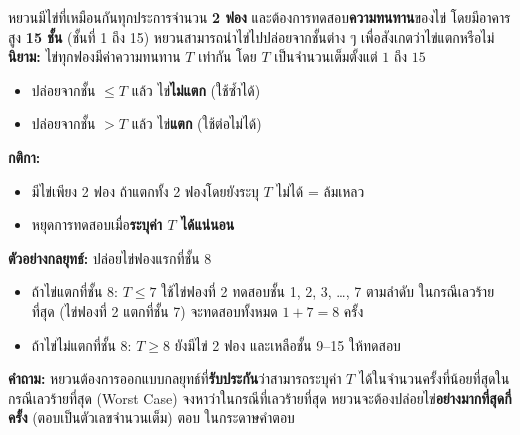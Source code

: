 \question หยวนมีไข่ที่เหมือนกันทุกประการจำนวน \textbf{2 ฟอง} และต้องการทดสอบ\textbf{ความทนทาน}ของไข่ โดยมีอาคารสูง \textbf{15 ชั้น} (ชั้นที่ 1 ถึง 15) หยวนสามารถนำไข่ไปปล่อยจากชั้นต่าง ๆ เพื่อสังเกตว่าไข่แตกหรือไม่
\newline
\textbf{นิยาม:} ไข่ทุกฟองมีค่าความทนทาน $T$ เท่ากัน โดย $T$ เป็นจำนวนเต็มตั้งแต่ $1$ ถึง $15$
\begin{itemize}
  \item ปล่อยจากชั้น $\le T$ แล้ว ไข่\textbf{ไม่แตก} (ใช้ซ้ำได้)
  \item ปล่อยจากชั้น $> T$ แล้ว ไข่\textbf{แตก} (ใช้ต่อไม่ได้)
\end{itemize}

\textbf{กติกา:}
\begin{itemize}
  \item มีไข่เพียง 2 ฟอง ถ้าแตกทั้ง 2 ฟองโดยยังระบุ $T$ ไม่ได้ = ล้มเหลว
  \item หยุดการทดสอบเมื่อ\textbf{ระบุค่า $T$ ได้แน่นอน}
\end{itemize}

\textbf{ตัวอย่างกลยุทธ์:} ปล่อยไข่ฟองแรกที่ชั้น 8
\begin{itemize}
  \item ถ้าไข่แตกที่ชั้น 8: $T \le 7$ ใช้ไข่ฟองที่ 2 ทดสอบชั้น 1, 2, 3, …, 7 ตามลำดับ ในกรณีเลวร้ายที่สุด (ไข่ฟองที่ 2 แตกที่ชั้น 7) จะทดสอบทั้งหมด $1 + 7 = 8$ ครั้ง
  \item ถ้าไข่ไม่แตกที่ชั้น 8: $T \ge 8$ ยังมีไข่ 2 ฟอง และเหลือชั้น 9--15 ให้ทดสอบ
\end{itemize}

\textbf{คำถาม:} หยวนต้องการออกแบบกลยุทธ์ที่\textbf{รับประกัน}ว่าสามารถระบุค่า $T$ ได้ในจำนวนครั้งที่น้อยที่สุดในกรณีเลวร้ายที่สุด (Worst Case) จงหาว่าในกรณีที่เลวร้ายที่สุด หยวนจะต้องปล่อยไข่\textbf{อย่างมากที่สุดกี่ครั้ง} (ตอบเป็นตัวเลขจำนวนเต็ม)
\newline\newline
ตอบ ในกระดาษคำตอบ
%
%
%
%
